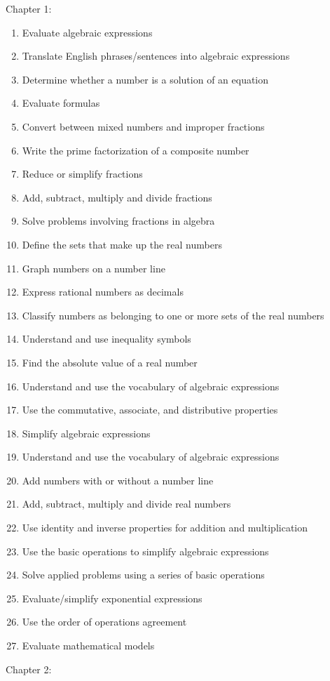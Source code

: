 \documentclass[11pt]{article}
\newenvironment{alphalist}{
\begin{enumerate}[label=(\arabic*),widest=107 ,leftmargin=25pt, itemsep=0pt]}
{\end{enumerate}}
\begin{document}
\noindent Chapter 1:
\begin{alphalist}
    \item Evaluate algebraic expressions
    \item Translate English phrases/sentences into algebraic expressions
    \item Determine whether a number is a solution of an equation
    \item Evaluate formulas
    \item Convert between mixed numbers and improper fractions
    \item Write the prime factorization of a composite number
    \item Reduce or simplify fractions
    \item Add, subtract, multiply and divide fractions
    \item Solve problems involving fractions in algebra
    \item Define the sets that make up the real numbers
    \item Graph numbers on a number line
    \item Express rational numbers as decimals
    \item Classify numbers as belonging to one or more sets of the real numbers
    \item Understand and use inequality symbols
    \item Find the absolute value of a real number
    \item Understand and use the vocabulary of algebraic expressions
    \item Use the commutative, associate, and distributive properties
    \item Simplify algebraic expressions
    \item Understand and use the vocabulary of algebraic expressions
    \item Add numbers with or without a number line
    \item Add, subtract, multiply and divide real numbers
    \item Use identity and inverse properties for addition and multiplication 
    \item Use the basic operations to simplify algebraic expressions 
    \item Solve applied problems using a series of basic operations
    \item Evaluate/simplify exponential expressions
    \item Use the order of operations agreement
    \item Evaluate mathematical models
\end{alphalist}
\noindent Chapter 2:
 
\end{document}
